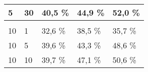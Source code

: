 \begin{table}[!htb]
\begin{tabular}{lllll}
\multicolumn{1}{|l|}{5}                                                      & \multicolumn{1}{l|}{30}                                                                                                       & \multicolumn{1}{l|}{40,5 \%}                                                                                          & \multicolumn{1}{l|}{44,9 \%}                                                                                           & \multicolumn{1}{l|}{52,0 \%}                                                                                           \\ \hline
                                                                             &                                                                                                                               &                                                                                                                       &                                                                                                                        &                                                                                                                        \\ \hline
\multicolumn{1}{|l|}{10}                                                     & \multicolumn{1}{l|}{1}                                                                                                        & \multicolumn{1}{l|}{32,6 \%}                                                                                          & \multicolumn{1}{l|}{38,5 \%}                                                                                           & \multicolumn{1}{l|}{35,7 \%}                                                                                           \\ \hline
\multicolumn{1}{|l|}{10}                                                     & \multicolumn{1}{l|}{5}                                                                                                        & \multicolumn{1}{l|}{39,6 \%}                                                                                          & \multicolumn{1}{l|}{43,3 \%}                                                                                           & \multicolumn{1}{l|}{48,6 \%}                                                                                           \\ \hline
\multicolumn{1}{|l|}{10}                                                     & \multicolumn{1}{l|}{10}                                                                                                       & \multicolumn{1}{l|}{39,7 \%}                                                                                          & \multicolumn{1}{l|}{47,1 \%}                                                                                           & \multicolumn{1}{l|}{50,6 \%}                                                                                           \\ \hline

\end{tabular}
\end{table}
